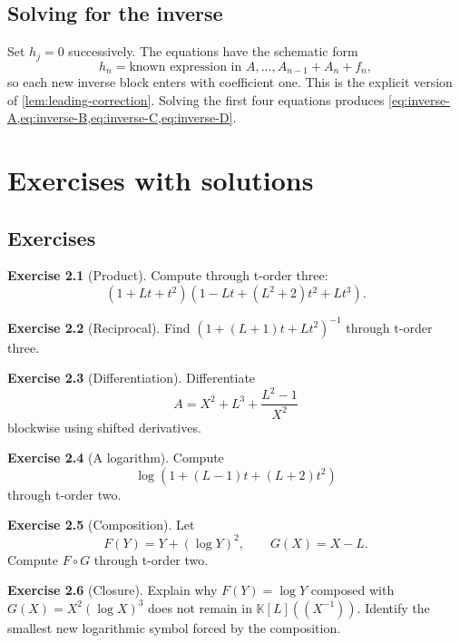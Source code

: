 \documentclass[11pt,openany]{book}
\theoremstyle{definition}
\newtheorem{exercise}{Exercise}[chapter]
\theoremstyle{plain}
\theoremstyle{remark}
\newcommand{\K}{\mathbb{K}}
\newcommand{\compose}{\mathbin{\circ}}
\begin{document}
\section{Solving for the inverse}
Set \(h_j=0\) successively.  The equations have the schematic form
\[
 h_n=\text{known expression in }A,\ldots,A_{n-1}+A_n+f_n,
\]
so each new inverse block enters with coefficient one.  This is the explicit
version of \cref{lem:leading-correction}.  Solving the first four equations
produces \cref{eq:inverse-A,eq:inverse-B,eq:inverse-C,eq:inverse-D}.

\chapter{Exercises with solutions}\label{app:exercises}

\section{Exercises}

\begin{exercise}[Product]
Compute through t-order three:
\[
 (1+Lt+t^2)(1-Lt+(L^2+2)t^2+Lt^3).
\]
\end{exercise}

\begin{exercise}[Reciprocal]
Find \((1+(L+1)t+Lt^2)^{-1}\) through t-order three.
\end{exercise}

\begin{exercise}[Differentiation]
Differentiate
\[
 A=X^2+L^3+\frac{L^2-1}{X^2}
\]
blockwise using shifted derivatives.
\end{exercise}

\begin{exercise}[A logarithm]
Compute
\[
 \log\left(1+(L-1)t+(L+2)t^2\right)
\]
through t-order two.
\end{exercise}

\begin{exercise}[Composition]
Let
\[
 F(Y)=Y+(\log Y)^2,
 \qquad
 G(X)=X-L.
\]
Compute \(F\compose G\) through t-order two.
\end{exercise}

\begin{exercise}[Closure]
Explain why \(F(Y)=\log Y\) composed with
\(G(X)=X^2(\log X)^3\) does not remain in \(\K[L]((X^{-1}))\).
Identify the smallest new logarithmic symbol forced by the composition.
\end{exercise}
\end{document}
